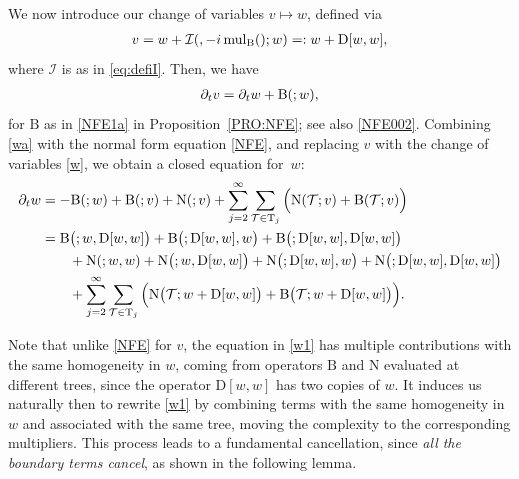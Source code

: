 \documentclass[a4paper,
11pt,  reqno]{amsart}
\makeatletter
\newcommand{\5}{\textup{V}}
\newcommand{\dt}{\partial_t}
\theoremstyle{remark}
\newcommand{\TT}{\mathcal{T}}
\newcommand{\Tr}{\mathrm{T}}
\DeclareMathOperator{\mulB}{mul_{\BB}}
\def\<#1>{\csname MH@symb@#1\endcsname}
\newcommand{\Ical}{\mathcal{I}}
\numberwithin{equation}{section}
\numberwithin{theorem}{section}
\newcommand{\NN}{\mathrm{N}}
\newcommand{\BB}{\mathrm{B}}
\newcommand{\D}{\mathrm{D}}
\makeatother
\begin{document}
We now introduce our change of variables $v\mapsto w$, defined via
\begin{align}
\label{w}
v 
=
w + \Ical(\<1>, - i \mulB(\<1>); w)
=:
w + \D[w, w]
,
\end{align}
where $\Ical$ is as in \eqref{eq:defiI}. Then, we have
\begin{align}
\label{wa}
\dt v
=
\dt w  + \BB(\<1>; w), 
\end{align}
for $\BB$ as in 
\eqref{NFE1a} in 
Proposition~\ref{PRO:NFE}; see also \eqref{NFE002}.
Combining \eqref{wa} with the normal form equation \eqref{NFE}, and replacing $v$ with the change of variables \eqref{w}, we obtain a closed equation for~$w$:
\begin{align}
\dt w & = -  \BB(\<1>;w) + \BB(\<1>;v) + \NN(\<1>;v)
+ \sum_{j=2}^\infty \sum_{\TT\in\Tr_j} \Big( \NN(\TT; v)  +
\BB(\TT; v) 
 \Big) \nonumber\\
& = 
 \BB\big(\<1>; w, \D[w, w] \big) 
+ \BB \big(\<1>; \D[w, w],w\big) 
+
\BB\big(\<1>; \D[w,w], \D[w, w]\big) 
  \nonumber\\
& \qquad 
+ \NN(\<1>; w ,w )  + \NN\big(\<1>; w, \D[w, w]\big) 
+
\NN\big(\<1>; \D[w, w], w\big) 
+ \NN\big(\<1>; \D[w, w],\D[w, w]\big) 
 \nonumber\\
& \qquad 
+ \sum_{j=2}^\infty \sum_{\TT\in \Tr_j} 
\Big( \NN\big(\TT; w+
\D[w, w]
\big) 
+  \BB\big(\TT; w + \D[w, w]\big) \Big).
\label{w1}
\end{align}




Note that unlike \eqref{NFE} for $v$, the equation in \eqref{w1} has multiple contributions with the same homogeneity in $w$, coming from operators $\BB$ and $\NN$ evaluated at different trees, 
since the operator $\D[w, w]$ has
two copies of $w$. 
It induces us naturally then to rewrite \eqref{w1} by combining terms with the same homogeneity in $w$ and associated with the same tree, moving the complexity to the corresponding multipliers. This process leads to a fundamental cancellation, since \textit{all the boundary terms cancel}, as shown in the following lemma.
\end{document}
